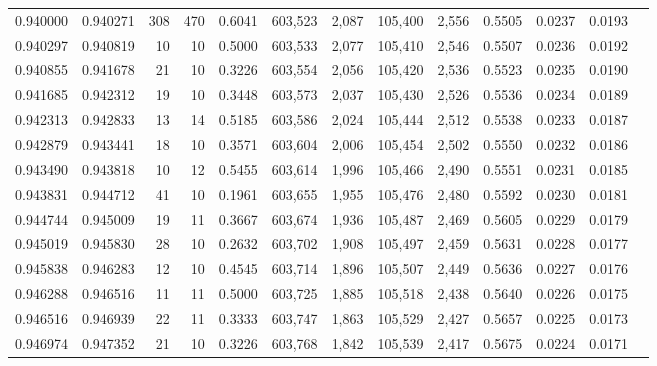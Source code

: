 \begin{tabular}{rrrrrrrrrrrrr}
0.940000 & 0.940271 &   308 & 470 &                                     0.6041 & 603,523 &   2,087 & 105,400 &   2,556 & 0.5505 & 0.0237 & 0.0193 \\
0.940297 & 0.940819 &    10 &  10 &                                     0.5000 & 603,533 &   2,077 & 105,410 &   2,546 & 0.5507 & 0.0236 & 0.0192 \\
0.940855 & 0.941678 &    21 &  10 &                                     0.3226 & 603,554 &   2,056 & 105,420 &   2,536 & 0.5523 & 0.0235 & 0.0190 \\
0.941685 & 0.942312 &    19 &  10 &                                     0.3448 & 603,573 &   2,037 & 105,430 &   2,526 & 0.5536 & 0.0234 & 0.0189 \\
0.942313 & 0.942833 &    13 &  14 &                                     0.5185 & 603,586 &   2,024 & 105,444 &   2,512 & 0.5538 & 0.0233 & 0.0187 \\
0.942879 & 0.943441 &    18 &  10 &                                     0.3571 & 603,604 &   2,006 & 105,454 &   2,502 & 0.5550 & 0.0232 & 0.0186 \\
0.943490 & 0.943818 &    10 &  12 &                                     0.5455 & 603,614 &   1,996 & 105,466 &   2,490 & 0.5551 & 0.0231 & 0.0185 \\
0.943831 & 0.944712 &    41 &  10 &                                     0.1961 & 603,655 &   1,955 & 105,476 &   2,480 & 0.5592 & 0.0230 & 0.0181 \\
0.944744 & 0.945009 &    19 &  11 &                                     0.3667 & 603,674 &   1,936 & 105,487 &   2,469 & 0.5605 & 0.0229 & 0.0179 \\
0.945019 & 0.945830 &    28 &  10 &                                     0.2632 & 603,702 &   1,908 & 105,497 &   2,459 & 0.5631 & 0.0228 & 0.0177 \\
0.945838 & 0.946283 &    12 &  10 &                                     0.4545 & 603,714 &   1,896 & 105,507 &   2,449 & 0.5636 & 0.0227 & 0.0176 \\
0.946288 & 0.946516 &    11 &  11 &                                     0.5000 & 603,725 &   1,885 & 105,518 &   2,438 & 0.5640 & 0.0226 & 0.0175 \\
0.946516 & 0.946939 &    22 &  11 &                                     0.3333 & 603,747 &   1,863 & 105,529 &   2,427 & 0.5657 & 0.0225 & 0.0173 \\
0.946974 & 0.947352 &    21 &  10 &                                     0.3226 & 603,768 &   1,842 & 105,539 &   2,417 & 0.5675 & 0.0224 & 0.0171 \\

\end{tabular}
